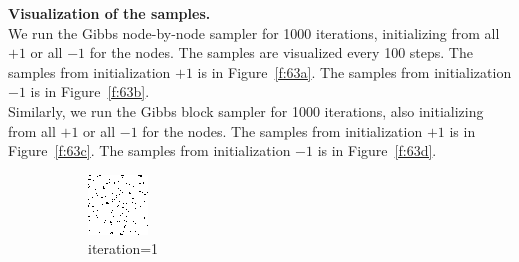 \documentclass{article}
\begin{document}
\noindent
\textbf{Visualization of the samples.}
\\

\noindent
We run the Gibbs node-by-node sampler for 1000 iterations, initializing from all $+1$ or all $-1$ for the nodes.
The samples are visualized every 100 steps. The samples from initialization $+1$ is in Figure~\ref{f:63a}.
The samples from initialization $-1$ is in Figure~\ref{f:63b}.
\\
%

\noindent
Similarly, we run the Gibbs block sampler for 1000 iterations, also initializing from all $+1$ or all $-1$ for the nodes.
The samples from initialization $+1$ is in Figure~\ref{f:63c}.
The samples from initialization $-1$ is in Figure~\ref{f:63d}.
%
\begin{figure}[h]
\captionsetup[subfigure]{labelformat=empty}
\centering
\begin{subfigure}[t]{0.18\textwidth}
\centering
\includegraphics[width=\textwidth]{./computational/results/gibbs_node_sampler_positive_iter_0.png}
\vspace{-0.6cm}
\caption{iteration=1}
\end{subfigure}\hspace{0.01\textwidth}
\begin{subfigure}[t]{0.18\textwidth}
\centering

\end{subfigure}
\end{figure}
\end{document}
